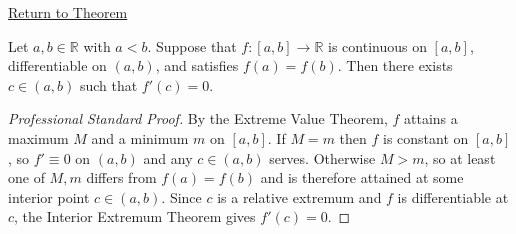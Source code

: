 \newpage
{}
\label{prf:rolles-theorem}

\begin{remark*}[Return]
\hyperref[thm:rolles-theorem]{Return to Theorem}
\end{remark*}

\begin{theorem*}
Let $a, b \in \mathbb{R}$ with $a < b$. Suppose that $f : [a,b] \to \mathbb{R}$ is continuous on $[a,b]$, differentiable on $(a,b)$, and satisfies $f(a) = f(b)$. Then there exists $c \in (a,b)$ such that $f'(c) = 0$.
\end{theorem*}

\begin{proof}[Professional Standard Proof]
\LRAProofBodyStart
By the Extreme Value Theorem, $f$ attains a maximum $M$ and a minimum $m$ on $[a,b]$. If $M = m$ then $f$ is constant on $[a,b]$, so $f' \equiv 0$ on $(a,b)$ and any $c \in (a,b)$ serves. Otherwise $M > m$, so at least one of $M, m$ differs from $f(a) = f(b)$ and is therefore attained at some interior point $c \in (a,b)$. Since $c$ is a relative extremum and $f$ is differentiable at $c$, the Interior Extremum Theorem gives $f'(c) = 0$.
\end{proof}


